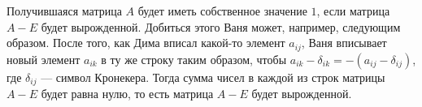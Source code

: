 \documentclass{article}
\begin{document}
Получившаяся матрица $A$ будет иметь собственное значение $1$, если матрица $A - E$ будет вырожденной. Добиться этого Ваня может, например, следующим образом. После того, как Дима вписал какой-то элемент $a_{ij}$, Ваня вписывает новый элемент $a_{ik}$ в ту же строку таким образом, чтобы $a_{ik}-\delta_{ik}=-(a_{ij}-\delta_{ij})$, где $\delta_{ij}$ --- символ Кронекера. Тогда сумма чисел в каждой из строк матрицы $A - E$ будет равна нулю, то есть матрица $A - E$ будет вырожденной.
\end{document}
